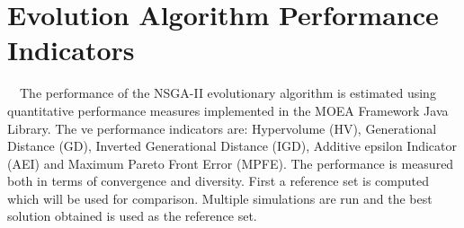 \section[Evolution Algorithm Performance Indicators]{\label{identificadorReferenciaCruzada}
Evolution Algorithm Performance Indicators}

\ \ The performance of the NSGA-II evolutionary algorithm is estimated using quantitative performance measures implemented in the MOEA Framework Java Library. The  ve performance indicators are: Hypervolume (HV), Generational Distance (GD), Inverted Generational Distance (IGD), Additive epsilon Indicator (AEI) and Maximum Pareto Front Error (MPFE). The performance is measured both in terms of convergence and diversity. First a reference set is computed which will be used for comparison. Multiple simulations are run and the best solution obtained is used as the reference set.
